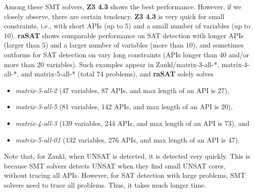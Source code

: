 \documentclass[runningheads,a4paper,oribibl]{llncs}
\begin{document}
Among these SMT solvers, {\bf Z3 4.3} shows the best performance. 
However, if we closely observe, there are certain tendency. 
{\bf Z3 4.3} is very quick for small constraints, i.e., with 
short APIs (up to $5$) and a small number of variables (up to $10$). 
{\bf raSAT} shows comparable performance on SAT detection with 
longer APIs (larger than $5$) and a larger number of variables (more than $10$), 
and sometimes outforms for SAT detection on vary long constraints 
(APIs longer than $40$ and/or more than $20$ variables). 
Such examples appear in Zankl/matrix-3-all-*, matrix-4-all-*, and matrix-5-all-* 
(total 74 problems), and {\bf raSAT} solely solves 
\begin{itemize}
\item {\em matrix-3-all-2} (47 variables, 87 APIs, and max length of an API is 27), 
\item {\em matrix-3-all-5} (81 variables, 142 APIs, and max length of an API is 20), 
\item {\em matrix-4-all-3} (139 variables, 244 APIs, and max length of an API is 73), and 
\item {\em matrix-5-all-01} (132 variables, 276 APIs, and max length of an API is 47). 
\end{itemize}
Note that, for Zankl, when UNSAT is detected, it is detected very quickly. 
This is because SMT solvers detects UNSAT when they find small UNSAT cores, 
without tracing all APIs. However, for SAT detection with large problems, 
SMT solvers need to trace all problems. Thus, it takes much longer time. 

\begin{table}[t]
\centering
{}
\medskip 
\caption{Comparison among SMT solvers over inequalities} \label{tab:comparison}
\end{table}
\end{document}

